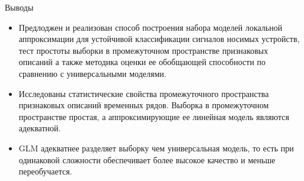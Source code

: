 \documentclass{beamer}
\DeclareMathOperator*{\argmin}{arg\,min}
\begin{document}
\begin{frame}{Выводы}
    \begin{itemize}
        \item Предлоджен и реализован способ построения набора моделей локальной аппроксимации
        для устойчивой классификации сигналов носимых устройств,
        тест простоты выборки в промежуточном пространстве признаковых
        описаний а также методика оценки ее обобщающей способности
        по сравнению с универсальными моделями.
        \item Исследованы статистические свойства промежуточного пространства
        признаковых описаний временных рядов. Выборка в промежуточном пространстве простая,
        а аппроксимирующие ее линейная модель являются адекватной.
        \item GLM адекватнее разделяет выборку чем универсальная модель, то есть
        при одинаковой сложности обеспечивает более высокое качество и меньше переобучается.
    \end{itemize}
\end{frame}



\end{document}
